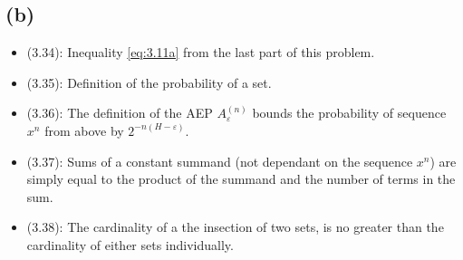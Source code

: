 \documentclass[12pt]{article}
\begin{document}
\subsection*{(b)}
\begin{itemize}
    \item (3.34): Inequality \ref{eq:3.11a} from the last part
        of this problem.
    \item (3.35): Definition of the probability of a set.
    \item (3.36): The definition of the AEP $A_\varepsilon^{(n)}$
        bounds the probability of sequence $x^n$ from above by
        $2^{-n(H-\varepsilon)}$.
    \item (3.37): Sums of a constant summand (not dependant on the
        sequence $x^n$) are simply equal to the product of the summand 
        and the number of terms in the sum.
    \item (3.38): The cardinality of a the insection of two sets, is no
        greater than the cardinality of either sets individually.
\end{itemize}
\end{document}
